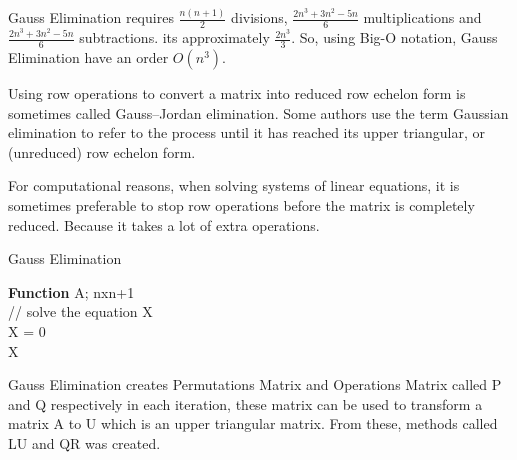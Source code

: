 \documentclass[letterpaper,12pt]{article}
\begin{document}
Gauss Elimination requires $\frac{n(n+1)}{2}$ divisions, $\frac{2 n^3 + 3 n^2 -5n}{6}$ multiplications and $\frac{2 n^3 + 3 n^2 -5n}{6}$ subtractions. its approximately $\frac{2n^3}{3}$.
So, using Big-O notation, Gauss Elimination have an order $O(n^3)$.

Using row operations to convert a matrix into reduced row echelon form is sometimes called Gauss–Jordan elimination. Some authors use the term Gaussian elimination to refer to the process until it has reached its upper triangular, or (unreduced) row echelon form.

For computational reasons, when solving systems of linear equations, it is sometimes preferable to stop row operations before the matrix is completely reduced. Because it takes a lot of extra operations.

\begin{center}
\begin{algorithm}[H]
   \caption{Gauss Elimination}
   \textbf{Function} A; nxn+1\\
   // solve the equation X\\
   X = {0}\\
   \Return X
  \end{algorithm}  
\end{center}

Gauss Elimination creates Permutations Matrix and Operations Matrix called P and Q respectively in each iteration, these matrix can be used to transform a matrix A to U which is an upper triangular matrix.
From these, methods called LU and QR was created.
\end{document}
